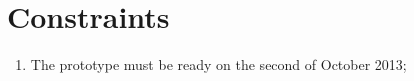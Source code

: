 \section{Constraints}
\begin{enumerate}
\item The prototype must be ready on the second of October 2013;
\end{enumerate}